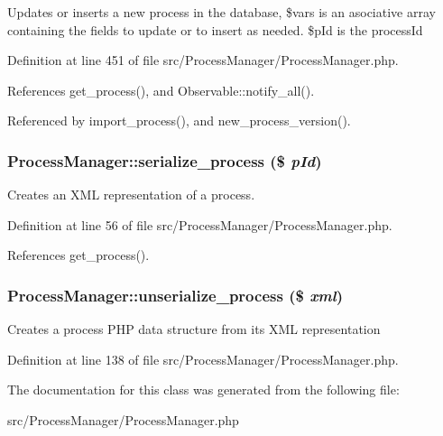 Updates or inserts a new process in the database, \$vars is an asociative array containing the fields to update or to insert as needed. \$p\-Id is the process\-Id 

Definition at line 451 of file src/Process\-Manager/Process\-Manager.php.

References get\_\-process(), and Observable::notify\_\-all().

Referenced by import\_\-process(), and new\_\-process\_\-version().
\subsubsection{\setlength{\rightskip}{0pt plus 5cm}Process\-Manager::serialize\_\-process (\$ {\em p\-Id})}\label{classProcessManager_a3}


Creates an XML representation of a process. 

Definition at line 56 of file src/Process\-Manager/Process\-Manager.php.

References get\_\-process().
\subsubsection{\setlength{\rightskip}{0pt plus 5cm}Process\-Manager::unserialize\_\-process (\$ {\em xml})}\label{classProcessManager_a4}


Creates a process PHP data structure from its XML representation 

Definition at line 138 of file src/Process\-Manager/Process\-Manager.php.

The documentation for this class was generated from the following file:\begin{CompactItemize}
\item 
src/Process\-Manager/Process\-Manager.php\end{CompactItemize}
